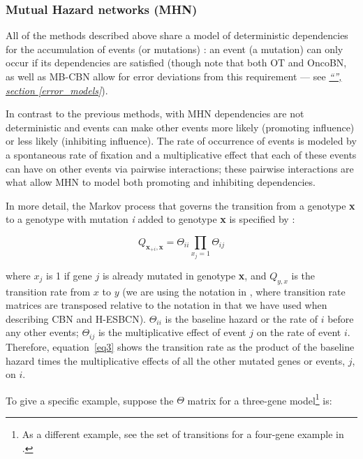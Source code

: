 \documentclass[a4paper,11pt]{article}
\newcommand*{\qrefP}[1]{\hyperref[{#1}]{\textit{``\nameref*{#1}'', section \ref*{#1}}}}
\begin{document}
\subsubsection{Mutual Hazard networks (MHN)}\label{mhndetails}

All of the methods described above share a model of deterministic dependencies for the accumulation of events (or mutations) \citep{schill2020modelling}: an event (a mutation) can only occur if its dependencies are satisfied (though note that both OT and OncoBN, as well as MB-CBN allow for error deviations from this requirement --- see \qrefP{error_models}). 

In contrast to the previous methods, with MHN \citep{schill2020modelling} dependencies are not deterministic and events can make other events more likely (promoting influence) or less likely (inhibiting influence). The rate of occurrence of events is modeled by a spontaneous rate of fixation and a multiplicative effect that each of these events can have on other events via pairwise interactions; these pairwise interactions are what allow MHN to model both promoting and inhibiting dependencies.


In more detail, the Markov process that governs the transition from a genotype \textbf{x} to a genotype with mutation \textit{i} added to genotype \textbf{x} is specified by \citep[eq.~2]{schill2020modelling}:

\begin{equation}\label{eq3}
  Q_{\mathbf{x}_{+i},\mathbf{x}} = \Theta_{ii} \prod\limits_{x_j = 1} \Theta_{ij}
\end{equation}


\flushleft where   $x_j$ is 1 if gene $j$ is already mutated in genotype \textbf{x}, and $Q_{y,x}$ is the transition rate from $x$ to $y$ (we are using the notation in \citealp{schill2020modelling}, where transition rate matrices are transposed relative to the notation in \citealp{montazeri2016large} that we have used when describing CBN and H-ESBCN). %
$\Theta_{ii}$ is the baseline hazard or the rate of $i$ before any other events; $\Theta_{ij}$ is the multiplicative effect of event $j$ on the rate of event $i$. Therefore, equation~\ref{eq3} shows the transition rate as the product of the baseline hazard times the multiplicative effects of all the other mutated genes or events, $j$, on $i$.


To give a specific example, suppose the $\Theta$ matrix for a three-gene model\footnote{As a different example, see the set of transitions for a four-gene example in \citealp[Fig.~2]{schill2020modelling}.} is:
\end{document}

